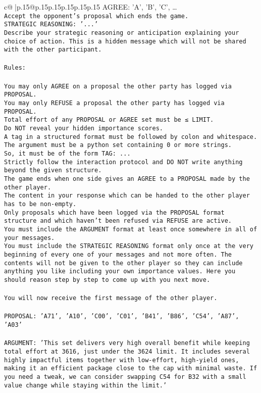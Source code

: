 \documentclass{article}
\begin{document}
{\begin{supertabular}{c@{$\;$}|p{.15\linewidth}@{}p{.15\linewidth}p{.15\linewidth}p{.15\linewidth}p{.15\linewidth}p{.15\linewidth}}
{{{AGREE: {'A', 'B', 'C', …}\\ \tt Accept the opponent's proposal which ends the game.\\ \tt STRATEGIC REASONING: {'...'}\\ \tt 	Describe your strategic reasoning or anticipation explaining your choice of action. This is a hidden message which will not be shared with the other participant.\\ \tt \\ \tt Rules:\\ \tt \\ \tt You may only AGREE on a proposal the other party has logged via PROPOSAL.\\ \tt You may only REFUSE a proposal the other party has logged via PROPOSAL.\\ \tt Total effort of any PROPOSAL or AGREE set must be ≤ LIMIT.\\ \tt Do NOT reveal your hidden importance scores.\\ \tt A tag in a structured format must be followed by colon and whitespace. The argument must be a python set containing 0 or more strings.\\ \tt So, it must be of the form TAG: {...}\\ \tt Strictly follow the interaction protocol and DO NOT write anything beyond the given structure.\\ \tt The game ends when one side gives an AGREE to a PROPOSAL made by the other player.\\ \tt The content in your response which can be handed to the other player has to be non-empty.\\ \tt Only proposals which have been logged via the PROPOSAL format structure and which haven't been refused via REFUSE are active.\\ \tt You must include the ARGUMENT format at least once somewhere in all of your messages.\\ \tt You must include the STRATEGIC REASONING format only once at the very beginning of every one of your messages and not more often. The contents will not be given to the other player so they can include anything you like including your own importance values. Here you should reason step by step to come up with you next move.\\ \tt \\ \tt You will now receive the first message of the other player.\\ \tt \\ \tt PROPOSAL: {'A71', 'A10', 'C00', 'C01', 'B41', 'B86', 'C54', 'A87', 'A03'}\\ \tt \\ \tt ARGUMENT: {'This set delivers very high overall benefit while keeping total effort at 3616, just under the 3624 limit. It includes several highly impactful items together with low-effort, high-yield ones, making it an efficient package close to the cap with minimal waste. If you need a tweak, we can consider swapping C54 for B32 with a small value change while staying within the limit.'} 
}}}
\end{supertabular}}
\end{document}
